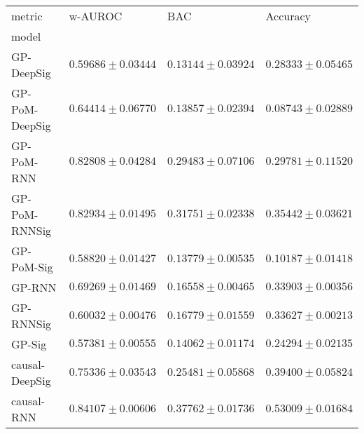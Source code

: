 \begin{tabular}{llll}
\toprule
metric &                                           w-AUROC &                                               BAC &                                          Accuracy \\
model          &                                                   &                                                   &                                                   \\
\midrule
GP-DeepSig     &                           $ 0.59686 \pm 0.03444 $ &                           $ 0.13144 \pm 0.03924 $ &                           $ 0.28333 \pm 0.05465 $ \\
GP-PoM-DeepSig &                           $ 0.64414 \pm 0.06770 $ &                           $ 0.13857 \pm 0.02394 $ &                           $ 0.08743 \pm 0.02889 $ \\
GP-PoM-RNN     &                           $ 0.82808 \pm 0.04284 $ &                           $ 0.29483 \pm 0.07106 $ &                           $ 0.29781 \pm 0.11520 $ \\
GP-PoM-RNNSig  &                           $ 0.82934 \pm 0.01495 $ &                           $ 0.31751 \pm 0.02338 $ &                           $ 0.35442 \pm 0.03621 $ \\
GP-PoM-Sig     &                           $ 0.58820 \pm 0.01427 $ &                           $ 0.13779 \pm 0.00535 $ &                           $ 0.10187 \pm 0.01418 $ \\
GP-RNN         &                           $ 0.69269 \pm 0.01469 $ &                           $ 0.16558 \pm 0.00465 $ &                           $ 0.33903 \pm 0.00356 $ \\
GP-RNNSig      &                           $ 0.60032 \pm 0.00476 $ &                           $ 0.16779 \pm 0.01559 $ &                           $ 0.33627 \pm 0.00213 $ \\
GP-Sig         &                           $ 0.57381 \pm 0.00555 $ &                           $ 0.14062 \pm 0.01174 $ &                           $ 0.24294 \pm 0.02135 $ \\
causal-DeepSig &                           $ 0.75336 \pm 0.03543 $ &                           $ 0.25481 \pm 0.05868 $ &                           $ 0.39400 \pm 0.05824 $ \\
causal-RNN     &                           $ 0.84107 \pm 0.00606 $ &                           $ 0.37762 \pm 0.01736 $ &                           $ 0.53009 \pm 0.01684 $ \\

\end{tabular}
